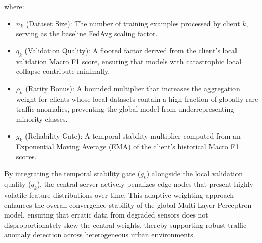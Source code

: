 where:
\begin{itemize}
    \item $n_k$ (Dataset Size): The number of training examples processed by client $k$, serving as the baseline FedAvg scaling factor.
    \item $q_k$ (Validation Quality): A floored factor derived from the client's local validation Macro F1 score, ensuring that models with catastrophic local collapse contribute minimally.
    \item $\rho_k$ (Rarity Bonus): A bounded multiplier that increases the aggregation weight for clients whose local datasets contain a high fraction of globally rare traffic anomalies, preventing the global model from underrepresenting minority classes.
    \item $g_k$ (Reliability Gate): A temporal stability multiplier computed from an Exponential Moving Average (EMA) of the client's historical Macro F1 scores. 
\end{itemize}

By integrating the temporal stability gate ($g_k$) alongside the local validation quality ($q_k$), the central server actively penalizes edge nodes that present highly volatile feature distributions over time. This adaptive weighting approach enhances the overall convergence stability of the global Multi-Layer Perceptron model, ensuring that erratic data from degraded sensors does not disproportionately skew the central weights, thereby supporting robust traffic anomaly detection across heterogeneous urban environments.
